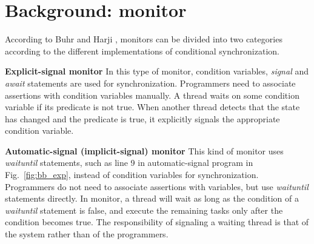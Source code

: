 \documentclass{sigplanconf}
\begin{document}
\section{Background: monitor} \label{sec:bg} 
According to Buhr and Harji \cite{bh05}, monitors can be divided into 
two categories according to the different implementations of conditional 
synchronization. 
\begin{description}
    \item{\bf Explicit-signal monitor} In this type of monitor, condition
        variables, {\em signal} and {\em await} statements are used for synchronization. 
    Programmers need to associate assertions with condition variables manually.
    A thread  waits on some condition variable 
    if its predicate is not true. When another thread detects that the state has 
    changed and the predicate is true, it explicitly signals the 
    appropriate condition variable.
    \item{\bf Automatic-signal (implicit-signal) monitor} This kind of monitor 
    uses {\em waituntil}
    statements, such as line 9 in automatic-signal program in
    Fig.~\ref{fig:bb_exp}, instead of condition variables for
    synchronization. Programmers do not need to associate assertions with
    variables, but use {\em waituntil} statements directly. In
    monitor, a thread will wait as long as the condition of a {\em waituntil}
    statement is false, and execute the remaining tasks only after the condition 
    becomes true. The responsibility of signaling a waiting thread is that of 
    the system rather than of the programmers. 
\end{description}

\end{document}
